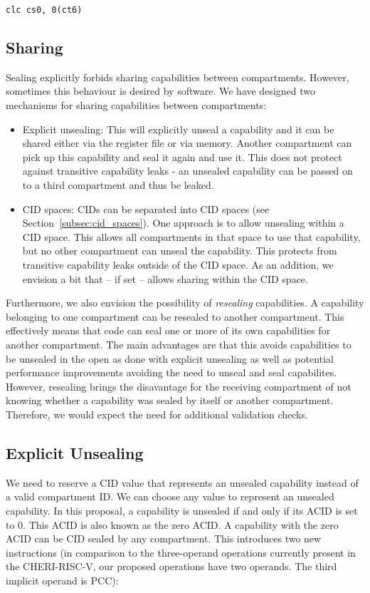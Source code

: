 \texttt{clc cs0, 0(ct6)}

\subsection{Sharing}

Sealing explicitly forbids sharing capabilities between compartments.
However, sometimes this behaviour is desired by software. We have designed two mechanisms for sharing capabilities between compartments:

\begin{itemize}
\item Explicit unsealing: This will explicitly unseal a capability and it can be shared either via the register file or via memory.
Another compartment can pick up this capability and seal it again and use it.
This does not protect against transitive capability leaks - an unsealed capability can be passed on to a third compartment and thus be leaked.
\item CID spaces: CIDs can be separated into CID spaces (see Section~\ref{subsec:cid_spaces}).
One approach is to allow unsealing within a CID space.
This allows all compartments in that space to use that capability, but no other compartment can unseal the capability.
This protects from transitive capability leaks outside of the CID space.
As an addition, we envision a bit that -- if set -- allows sharing within the CID space.
\end{itemize}

Furthermore, we also envision the possibility of \textit{resealing} capabilities.
A capability belonging to one compartment can be resealed to another compartment.
This effectively means that code can seal one or more of its own capabilities for another compartment.
The main advantages are that this avoids capabilities to be unsealed in the open as done with explicit unsealing as well as potential performance improvements avoiding the need to unseal and seal capabilites.
However, resealing brings the disavantage for the receiving compartment of not knowing whether a capability was sealed by itself or another compartment.
Therefore, we would expect the need for additional validation checks.

\subsection{Explicit Unsealing}

We need to reserve a CID value that represents an unsealed capability instead of a valid compartment ID.
We can choose any value to represent an unsealed capability.
In this proposal, a capability is unsealed if and only if  its ACID is set to 0.
This ACID is also known as the zero ACID. A capability with the zero ACID can be CID sealed by any compartment.
This introduces two new instructions (in comparison to the three-operand operations currently present in the CHERI-RISC-V, our proposed operations have two operands. The third implicit operand is PCC):


